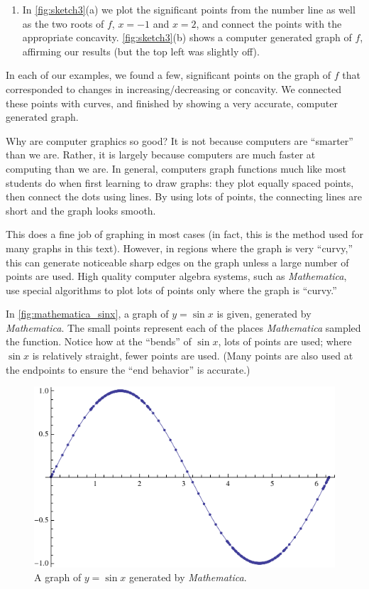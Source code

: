 {\begin{enumerate}
	\item	In \autoref{fig:sketch3}(a) we plot the significant points from the number line as well as the two roots of $f$, $x=-1$ and $x=2$, and connect the points with the appropriate concavity. \autoref{fig:sketch3}(b) shows a computer generated graph of $f$, affirming our results (but the top left was slightly off).\eoehere
\end{enumerate}}

In each of our examples, we found a few, significant points on the graph of $f$ that corresponded to changes in increasing/decreasing or concavity. We connected these points with curves, and finished by showing a very accurate, computer generated graph. 

Why are computer graphics so good? It is not because computers are ``smart\-er'' than we are. Rather, it is largely because computers are much faster at computing than we are. In general, computers graph functions much like most students do when first learning to draw graphs: they plot equally spaced points, then connect the dots using lines. By using lots of points, the connecting lines are short and the graph looks smooth. 

This does a fine job of graphing in most cases (in fact, this is the method used for many graphs in this text). However, in regions where the graph is very ``curvy,'' this can generate noticeable sharp edges on the graph unless a large number of points are used. High quality computer algebra systems, such as \textit{Mathematica}, use special algorithms to plot lots of points only where the graph is ``curvy.''

In \autoref{fig:mathematica_sinx}, a graph of $y=\sin x$ is given, generated by \textit{Mathematica}. The small points represent each of the places \textit{Mathematica} sampled the function. Notice how at the ``bends'' of $\sin x$, lots of points are used; where $\sin x$ is relatively straight, fewer points are used. (Many points are also used at the endpoints to ensure the ``end behavior'' is accurate.) 

\begin{figure}[!ht]
\centering
\includegraphics{figures/raw/figmathematica_sinx}
\caption{A graph of $y=\sin x$ generated by \textit{Mathematica}.}
\label{fig:mathematica_sinx}
\end{figure}

